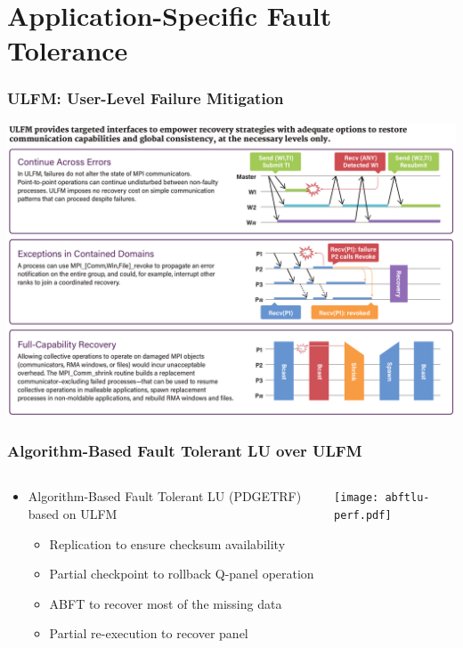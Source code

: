 \section{Application-Specific Fault Tolerance}

\begin{frame}
  \frametitle{ULFM: User-Level Failure Mitigation}

  \centering\includegraphics[height=.85\textheight]{ulfm.png}

\end{frame}




\begin{frame}
  \frametitle{Algorithm-Based Fault Tolerant LU over ULFM}

  \begin{columns}
    \begin{column}{.3\textwidth}
      \begin{itemize}
      \item Algorithm-Based Fault Tolerant LU (PDGETRF) based on ULFM
        \begin{itemize}
        \item Replication to ensure checksum availability
        \item Partial checkpoint to rollback Q-panel operation
        \item ABFT to recover most of the missing data
        \item Partial re-execution to recover panel
        \end{itemize}
      \end{itemize}
    \end{column}
    \begin{column}{.7\textwidth}
        \begin{center}
          \texttt{[image: abftlu-perf.pdf]}
        \end{center}
    \end{column}
  \end{columns}
\end{frame}

